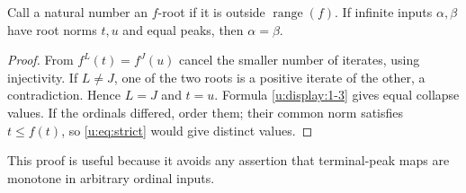 \begin{lemma}\label{u:lem:roots}
Call a natural number an $f$-root if it is outside $\operatorname{range}(f)$.
If infinite inputs $\alpha,\beta$ have root norms $t,u$ and equal peaks,
then $\alpha=\beta$.
\end{lemma}
\begin{proof}
From $f^L(t)=f^J(u)$ cancel the smaller number of iterates, using injectivity.
If $L\ne J$, one of the two roots is a positive iterate of the other, a
contradiction. Hence $L=J$ and $t=u$. Formula \eqref{u:display:1-3} gives equal collapse
values. If the ordinals differed, order them; their common norm satisfies
$t\le f(t)$, so \eqref{u:eq:strict} would give distinct values.
\end{proof}
This proof is useful because it avoids any assertion that terminal-peak
maps are monotone in arbitrary ordinal inputs.

